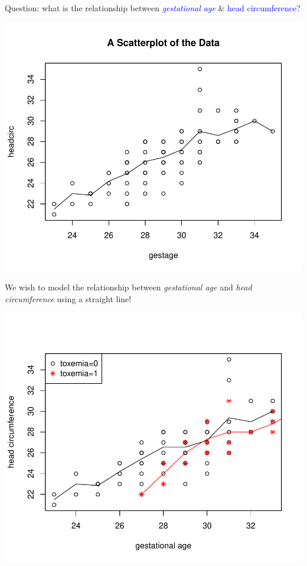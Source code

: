 \documentclass{article}\usepackage[]{graphicx}\usepackage[svgnames]{xcolor}
\makeatletter
\def\maxwidth{ %
  \ifdim\Gin@nat@width>\linewidth
    \linewidth
  \else
    \Gin@nat@width
  \fi
}
\newenvironment{knitrout}{}{} %
\makeatother
\begin{document}
Question: what is the relationship between \textcolor{Blue}{\emph{gestational age}} \& \textcolor{Blue}{head circumference}?
\begin{knitrout}
\color{fgcolor}

{\centering \includegraphics[width=\maxwidth]{figure/unnamed-chunk-14-1} 

}


\end{knitrout}
We wish to model the relationship between \emph{gestational age} and \emph{head
      circumference} using a straight line!
\begin{knitrout}
\color{fgcolor}

{\centering \includegraphics[width=\maxwidth]{figure/unnamed-chunk-15-1} 

}


\end{knitrout}
\end{document}

